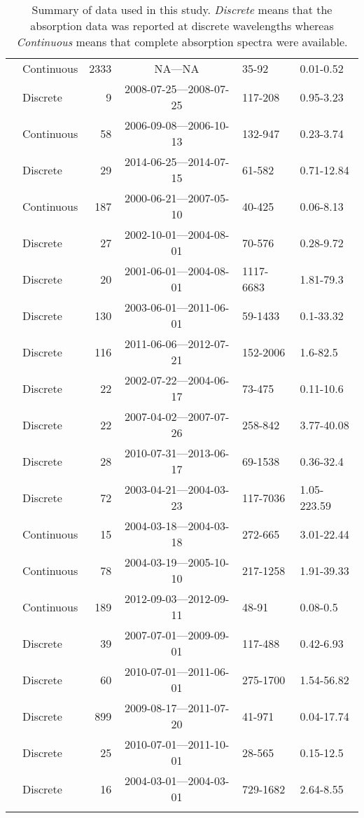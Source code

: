 \begin{longtable}{llrcll}
  \citet{Nelson2002, Nelson2007, Nelson2010} & Continuous & 2333 & NA---NA & 35-92 & 0.01-0.52 \\ 
  \citet{Nguyen2010} & Discrete &   9 & 2008-07-25---2008-07-25 & 117-208 & 0.95-3.23 \\ 
  \citet{Norman2011} & Continuous &  58 & 2006-09-08---2006-10-13 & 132-947 & 0.23-3.74 \\ 
  \citet{Oestreich2016} & Discrete &  29 & 2014-06-25---2014-07-15 & 61-582 & 0.71-12.84 \\ 
  \citet{Osburn2007} & Continuous & 187 & 2000-06-21---2007-05-10 & 40-425 & 0.06-8.13 \\ 
  \citet{Osburn2009} & Discrete &  27 & 2002-10-01---2004-08-01 & 70-576 & 0.28-9.72 \\ 
  \citet{Osburn2011a} & Discrete &  20 & 2001-06-01---2004-08-01 & 1117-6683 & 1.81-79.3 \\ 
  \citet{Osburn2016} & Discrete & 130 & 2003-06-01---2011-06-01 & 59-1433 & 0.1-33.32 \\ 
  \citet{Polaris2012} & Discrete & 116 & 2011-06-06---2012-07-21 & 152-2006 & 1.6-82.5 \\ 
  \citet{Retamal2007} & Discrete &  22 & 2002-07-22---2004-06-17 & 73-475 & 0.11-10.6 \\ 
  \citet{shank2009} & Discrete &  22 & 2007-04-02---2007-07-26 & 258-842 & 3.77-40.08 \\ 
  \citet{Shen2014} & Discrete &  28 & 2010-07-31---2013-06-17 & 69-1538 & 0.36-32.4 \\ 
  \citet{Sickman2010} & Discrete &  72 & 2003-04-21---2004-03-23 & 117-7036 & 1.05-223.59 \\ 
  \citet{Stedmon2007a} & Continuous &  15 & 2004-03-18---2004-03-18 & 272-665 & 3.01-22.44 \\ 
  \citet{Stedmon2011} & Continuous &  78 & 2004-03-19---2005-10-10 & 217-1258 & 1.91-39.33 \\ 
  \citet{Stedmon2015} & Continuous & 189 & 2012-09-03---2012-09-11 & 48-91 & 0.08-0.5 \\ 
  \citet{Tehrani2013} & Discrete &  39 & 2007-07-01---2009-09-01 & 117-488 & 0.42-6.93 \\ 
  \citet{Wagner2015} & Discrete &  60 & 2010-07-01---2011-06-01 & 275-1700 & 1.54-56.82 \\ 
  \citet{Werdell2003} & Discrete & 899 & 2009-08-17---2011-07-20 & 41-971 & 0.04-17.74 \\ 
  \citet{Yang2013a} & Discrete &  25 & 2010-07-01---2011-10-01 & 28-565 & 0.15-12.5 \\ 
  \citet{Zhang2005} & Discrete &  16 & 2004-03-01---2004-03-01 & 729-1682 & 2.64-8.55 \\ 
   \hline
\hline
\caption{Summary of data used in this study. \textit{Discrete} means that the 
absorption data was reported at discrete wavelengths whereas 
\textit{Continuous} means that complete absorption spectra were available.} 
\end{longtable}
\endgroup
